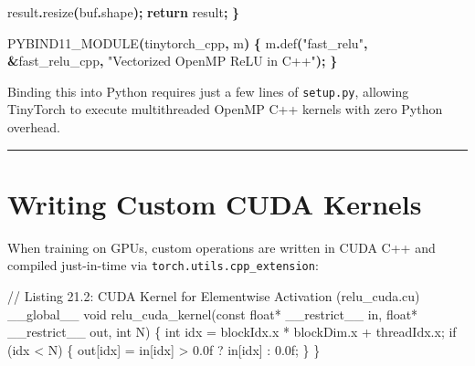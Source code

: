 \documentclass[
  letterpaper,
]{scrbook}
\newenvironment{Shaded}{\begin{snugshade}}{\end{snugshade}}
\newcommand{\ControlFlowTok}[1]{\textcolor[rgb]{0.13,0.29,0.53}{\textbf{#1}}}
\newcommand{\NormalTok}[1]{#1}
\newcommand{\OperatorTok}[1]{\textcolor[rgb]{0.81,0.36,0.00}{\textbf{#1}}}
\newcommand{\StringTok}[1]{\textcolor[rgb]{0.31,0.60,0.02}{#1}}
\begin{document}
\begin{Shaded}
\begin{Highlighting}[]
\NormalTok{    result}\OperatorTok{.}\NormalTok{resize}\OperatorTok{(}\NormalTok{buf}\OperatorTok{.}\NormalTok{shape}\OperatorTok{);}
    \ControlFlowTok{return}\NormalTok{ result}\OperatorTok{;}
\OperatorTok{\}}

\NormalTok{PYBIND11\_MODULE}\OperatorTok{(}\NormalTok{tinytorch\_cpp}\OperatorTok{,}\NormalTok{ m}\OperatorTok{)} \OperatorTok{\{}
\NormalTok{    m}\OperatorTok{.}\NormalTok{def}\OperatorTok{(}\StringTok{"fast\_relu"}\OperatorTok{,} \OperatorTok{\&}\NormalTok{fast\_relu\_cpp}\OperatorTok{,} \StringTok{"Vectorized OpenMP ReLU in C++"}\OperatorTok{);}
\OperatorTok{\}}
\end{Highlighting}
\end{Shaded}

Binding this into Python requires just a few lines of \texttt{setup.py},
allowing TinyTorch to execute multithreaded OpenMP C++ kernels with zero
Python overhead.

\begin{center}\rule{0.5\linewidth}{0.5pt}\end{center}

\section{Writing Custom CUDA Kernels}\label{writing-custom-cuda-kernels}

When training on GPUs, custom operations are written in CUDA C++ and
compiled just-in-time via \texttt{torch.utils.cpp\_extension}:

\begin{Shaded}
\begin{Highlighting}[]
\NormalTok{// Listing 21.2: CUDA Kernel for Elementwise Activation (relu\_cuda.cu)}
\NormalTok{\_\_global\_\_ void relu\_cuda\_kernel(const float* \_\_restrict\_\_ in, float* \_\_restrict\_\_ out, int N) \{}
\NormalTok{    int idx = blockIdx.x * blockDim.x + threadIdx.x;}
\NormalTok{    if (idx \textless{} N) \{}
\NormalTok{        out[idx] = in[idx] \textgreater{} 0.0f ? in[idx] : 0.0f;}
\NormalTok{    \}}
\NormalTok{\}}
\end{Highlighting}
\end{Shaded}
\end{document}
